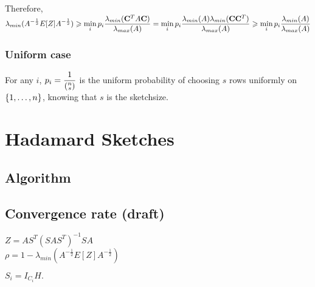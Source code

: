  Therefore, 
$\displaystyle \lambda_{min}(A^{-\frac12}E[Z]A^{-\frac12} ) \geqslant  \min_{i} p_{i} \frac{\lambda_{min}(\bold{C}^{T}A \bold{C} )}{\lambda_{max}(A)}  =  \min_{i} p_{i} \frac{ \lambda_{min}(A) \lambda_{min}(\bold{C} \bold{C}^{T} )}{\lambda_{max}(A)}  \geqslant  \min_{i} p_{i} \frac{\lambda_{min}(A)}{\lambda_{max}(A)}$


\subsection{Uniform case}

For any $i$, $p_{i} = \displaystyle\frac{1}{\left(\substack{ n \\ s }\right)}$ is the uniform probability of choosing $s$ rows uniformly on $\left\{1,\dots,n\right\}$, knowing that $s$ is the sketchsize. \\


 
 
 

\chapter{Hadamard Sketches}

%
%
%


\section{Algorithm}


\section{Convergence rate (draft)}

$Z = A S^{T} (S A S^{T})^{-1} S A$\\


$\rho = 1 - \lambda_{min}(A^{-\frac12}E[Z]A^{-\frac12}  )$

$S_{i} = I_{C_{i}} H.$\\

